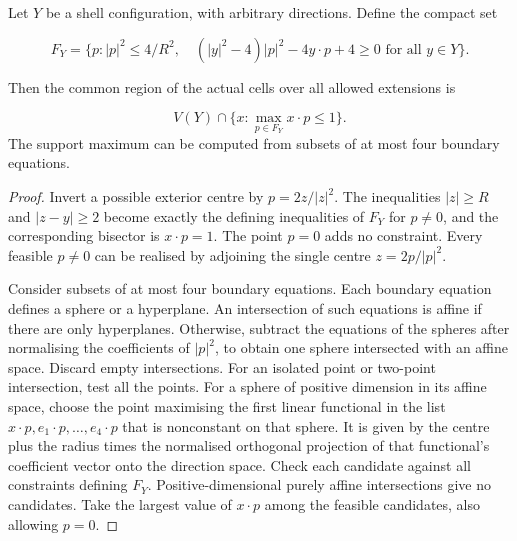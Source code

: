 \begin{prop}\label{prop:exact-shell-test}
Let $Y$ be a shell configuration, with arbitrary directions. Define the compact set

\[
F_Y=\{p:|p|^2\le4/R^2,\quad (|y|^2-4)|p|^2-4y\cdot p+4\ge0\text{ for all }y\in Y\}.
\]

Then the common region of the actual cells over all allowed extensions is

\[
V(Y)\cap\{x:\max_{p\in F_Y}x\cdot p\le1\}.
\]
The support maximum can be computed from subsets of at most four boundary equations.
\end{prop}
\begin{proof}
Invert a possible exterior centre by $p=2z/|z|^2$. The inequalities $|z|\ge R$ and
$|z-y|\ge2$ become exactly the defining inequalities of $F_Y$ for $p\ne0$, and the
corresponding bisector is $x\cdot p=1$. The point $p=0$ adds no constraint. Every feasible
$p\ne0$ can be realised by adjoining the single centre $z=2p/|p|^2$.

Consider subsets of at most four boundary equations. Each boundary equation defines a
sphere or a hyperplane. An intersection of such equations is affine if there are only
hyperplanes. Otherwise, subtract the equations of the spheres after normalising the
coefficients of $|p|^2$, to obtain one sphere intersected with an affine space. Discard
empty intersections. For an isolated point or two-point intersection, test all the points.
For a sphere of positive dimension in its affine space, choose the point maximising the
first linear functional in the list $x\cdot p,e_1\cdot p,\ldots,e_4\cdot p$ that is
nonconstant on that sphere. It is given by the centre plus the radius times the normalised
orthogonal projection of that functional's coefficient vector onto the direction space.
Check each candidate against all constraints defining $F_Y$. Positive-dimensional purely
affine intersections give no candidates. Take the largest value of $x\cdot p$ among the
feasible candidates, also allowing $p=0$.


\end{proof}
